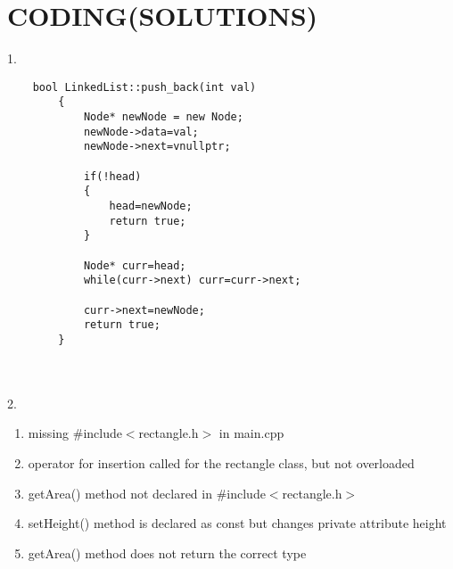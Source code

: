 \documentclass[a4paper]{article}
\begin{document}
\section{CODING(SOLUTIONS)}
1. \begin{verbatim}
    bool LinkedList::push_back(int val)
        {
            Node* newNode = new Node;
            newNode->data=val;
            newNode->next=vnullptr;

            if(!head)
            {
                head=newNode;
                return true;
            }

            Node* curr=head;
            while(curr->next) curr=curr->next;

            curr->next=newNode;
            return true;
        }
\end{verbatim}\\\\
2. \begin{enumerate}
    \item missing \#include$<$rectangle.h$>$ in main.cpp
    \item operator for insertion called for the rectangle class, but not overloaded
    \item getArea() method not declared in \#include$<$rectangle.h$>$
    \item setHeight() method is declared as const but changes private attribute height
    \item getArea() method does not return the correct type 
\end{enumerate}
\end{document}
